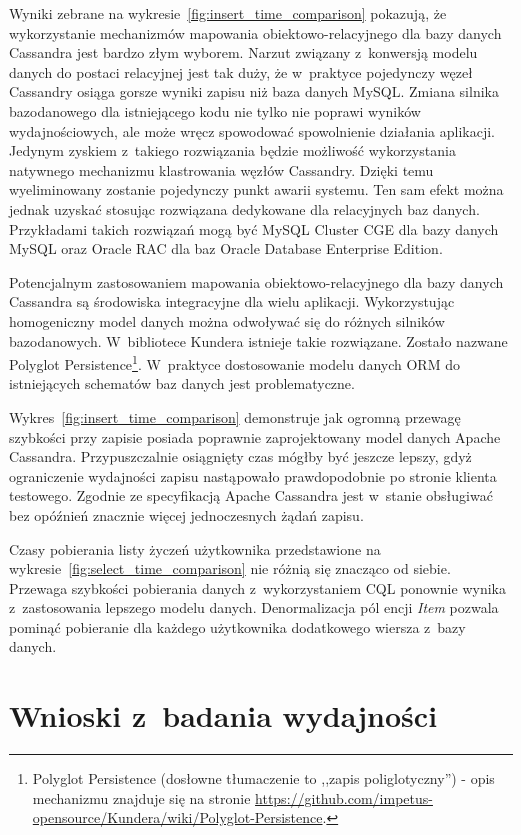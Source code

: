 Wyniki zebrane na wykresie~\ref{fig:insert_time_comparison} pokazują, że wykorzystanie mechanizmów mapowania obiektowo-relacyjnego dla bazy danych Cassandra jest bardzo złym wyborem. Narzut związany z~konwersją modelu danych do postaci relacyjnej jest tak duży, że w~praktyce pojedynczy węzeł Cassandry osiąga gorsze wyniki zapisu niż baza danych MySQL. Zmiana silnika bazodanowego dla istniejącego kodu nie tylko nie poprawi wyników wydajnościowych, ale może wręcz spowodować spowolnienie działania aplikacji. Jedynym zyskiem z~takiego rozwiązania będzie możliwość wykorzystania natywnego mechanizmu klastrowania węzłów Cassandry. Dzięki temu wyeliminowany zostanie pojedynczy punkt awarii systemu. Ten sam efekt można jednak uzyskać stosując rozwiązana dedykowane dla relacyjnych baz danych. Przykładami takich rozwiązań mogą być MySQL Cluster CGE dla bazy danych MySQL oraz Oracle RAC dla baz Oracle Database Enterprise Edition.

Potencjalnym zastosowaniem mapowania obiektowo-relacyjnego dla bazy danych Cassandra są środowiska integracyjne dla wielu aplikacji. Wykorzystując homogeniczny model danych można odwoływać się do różnych silników bazodanowych. W~bibliotece Kundera istnieje takie rozwiązane. Zostało nazwane Polyglot Persistence\footnote{Polyglot Persistence (dosłowne tłumaczenie to ,,zapis poliglotyczny'') - opis mechanizmu znajduje się na stronie \url{https://github.com/impetus-opensource/Kundera/wiki/Polyglot-Persistence}.}. W~praktyce dostosowanie modelu danych ORM do istniejących schematów baz danych jest problematyczne.  

Wykres~\ref{fig:insert_time_comparison} demonstruje jak ogromną przewagę szybkości przy zapisie posiada poprawnie zaprojektowany model danych Apache Cassandra. Przypuszczalnie osiągnięty czas mógłby być jeszcze lepszy, gdyż ograniczenie wydajności zapisu nastąpowało prawdopodobnie po stronie klienta testowego. Zgodnie ze specyfikacją Apache Cassandra jest w~stanie obsługiwać bez opóźnień znacznie więcej jednoczesnych żądań zapisu.

Czasy pobierania listy życzeń użytkownika przedstawione na wykresie~\ref{fig:select_time_comparison} nie różnią się znacząco od siebie. Przewaga szybkości pobierania danych z~wykorzystaniem CQL ponownie wynika z~zastosowania lepszego modelu danych. Denormalizacja pól encji \emph{Item} pozwala pominąć pobieranie dla każdego użytkownika dodatkowego wiersza z~bazy danych. 

\section{Wnioski z~badania wydajności}

